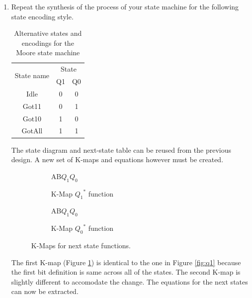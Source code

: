 \documentclass[CMPE]{KGCOEReport}
\begin{document}
\begin{enumerate}
\item Repeat the synthesis of the process of your state machine for the following state encoding style.

\begin{table}[h!]
\renewcommand{\arraystretch}{1.2}
\setlength{\tabcolsep}{12pt}
\caption{Alternative states and encodings for the Moore state machine}
\begin{center}
\vspace{-0.5cm}
\begin{tabular}{ccc}
\multirow{2}{*}{State name}& \multicolumn{2}{c}{State}\\
& Q1 & Q0\\\cline{1-3}
Idle  & 0 & 0\\
Got11 & 0 & 1\\
Got10 & 1 & 0\\
GotAll & 1 & 1

\end{tabular}
\end{center}
\label{tab:func}
\end{table}

The state diagram and next-state table can be reused from the previous design. A new set of K-maps and equations however must be created.

\begin{figure}[h!]
	\begin{subfigure}{.5\textwidth}
		\centering
		\begin{Karnaugh}{AB}{$Q_1Q_0$}
		\end{Karnaugh}
		\caption{K-Map ${Q_1}^*$ function}
		\label{fig:q1-2}
	\end{subfigure}
	\begin{subfigure}{.5\textwidth}
		\centering
		\begin{Karnaugh}{AB}{$Q_1Q_0$}
		\end{Karnaugh}
		\caption{K-Map ${Q_0}^*$ function}
		\label{fig:q0-2}
	\end{subfigure}
	
	\caption{K-Maps for next state functions.}
	\label{fig:kmap-2}
\end{figure}

The first K-map (Figure \ref{fig:q1-2}) is identical to the one in Figure \ref{fig:q1} because the first bit definition is same across all of the states. The second K-map is slightly different to accomodate the change. The equations for the next states can now be extracted.


\end{enumerate}
\end{document}
